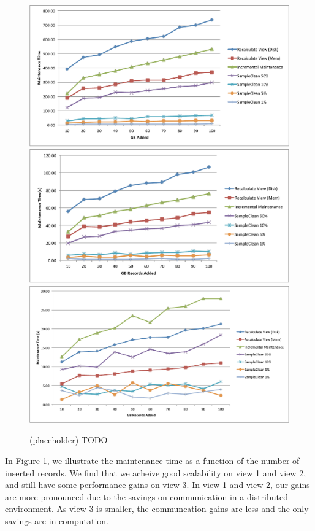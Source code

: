 \begin{figure}[h]
\label{exp6conviva}
\centering
\includegraphics[scale=0.20]{exp/coniva-v1.pdf}
\includegraphics[scale=0.20]{exp/conviva-v2.pdf}
 \includegraphics[scale=0.20]{exp/conviva-v3.pdf}
 \caption{(placeholder) TODO}
\end{figure}

In Figure \ref{exp6conviva}, we illustrate the maintenance time as a function of the number of inserted records.
We find that we acheive good scalability on view 1 and view 2, and still have some performance gains on view 3.
In view 1 and view 2, our gains are more pronounced due to the savings on communication in a distributed environment.
As view 3 is smaller, the communcation gains are less and the only savings are in computation.


